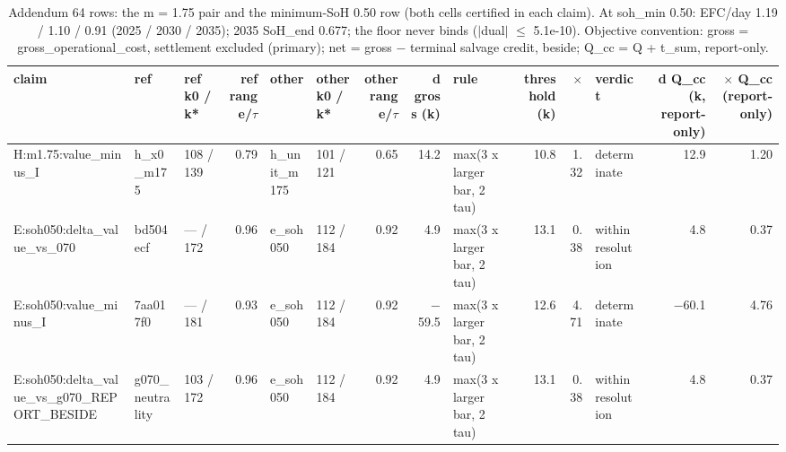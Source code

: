 \begin{table}[htbp]
\centering
\scriptsize
\caption{Addendum 64 rows: the m = 1.75 pair and the minimum-SoH 0.50 row (both cells certified in each claim). At soh\_min 0.50: EFC/day 1.19 / 1.10 / 0.91 (2025 / 2030 / 2035); 2035 SoH\_end 0.677; the floor never binds ($|$dual$|$ $\leq$ 5.1e-10). Objective convention: gross = gross\_operational\_cost, settlement excluded (primary); net = gross $-$ terminal salvage credit, beside; Q\_cc = Q + t\_sum, report-only.}
\label{tab:T10}
\begin{tabular}{lllrllrrlrrlrr}
\toprule
claim & ref & ref k0 / k* & ref range/$\tau$ & other & other k0 / k* & other range/$\tau$ & d gross (k\texteuro{}) & rule & threshold (k\texteuro{}) & $\times$ & verdict & d Q\_cc (k\texteuro{}, report-only) & $\times$ Q\_cc (report-only) \\
\midrule
H:m1.75:value\_minus\_I & h\_x0\_m175 & 108 / 139 & 0.79 & h\_unit\_m175 & 101 / 121 & 0.65 & 14.2 & max(3 x larger bar, 2 tau) & 10.8 & 1.32 & determinate & 12.9 & 1.20 \\
E:soh050:delta\_value\_vs\_070 & bd504ecf & --- / 172 & 0.96 & e\_soh050 & 112 / 184 & 0.92 & 4.9 & max(3 x larger bar, 2 tau) & 13.1 & 0.38 & within resolution & 4.8 & 0.37 \\
E:soh050:value\_minus\_I & 7aa017f0 & --- / 181 & 0.93 & e\_soh050 & 112 / 184 & 0.92 & $-$59.5 & max(3 x larger bar, 2 tau) & 12.6 & 4.71 & determinate & $-$60.1 & 4.76 \\
E:soh050:delta\_value\_vs\_g070\_REPORT\_BESIDE & g070\_neutrality & 103 / 172 & 0.96 & e\_soh050 & 112 / 184 & 0.92 & 4.9 & max(3 x larger bar, 2 tau) & 13.1 & 0.38 & within resolution & 4.8 & 0.37 \\
\bottomrule
\end{tabular}
\end{table}
